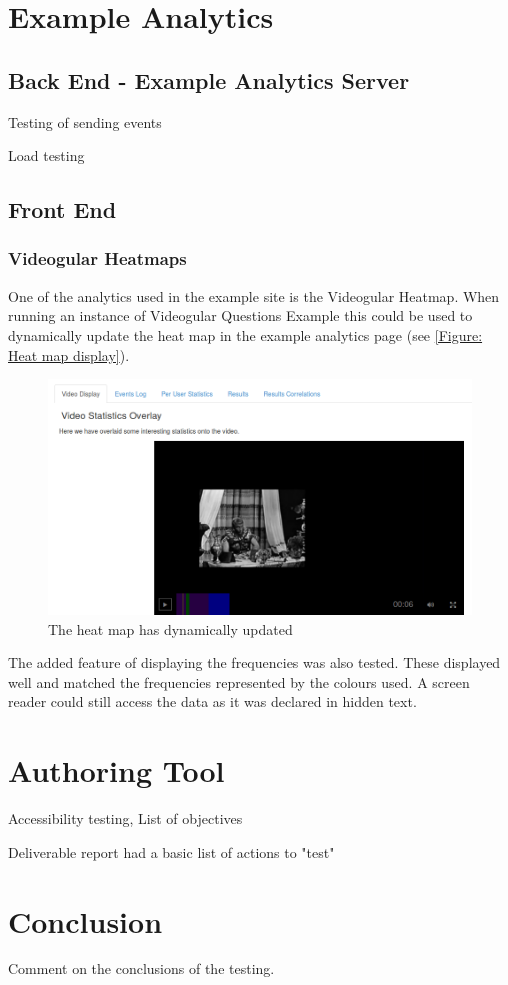 \section{Example Analytics}

\subsection{Back End - Example Analytics Server}
\label{Subsection:Analytics server in example}
Testing of sending events

Load testing

\subsection{Front End}
\subsubsection{Videogular Heatmaps}
\label{Subsubsection:Videogular Heatmaps in example}

One of the analytics used in the example site is the \gls{Videogular} Heatmap. When running an instance of \gls{Videogular} Questions Example this could be used to dynamically update the heat map in the example analytics page (see \autoref{Figure: Heat map display}).

\begin{figure}[h]
	\centering 
		\includegraphics[scale=0.4]{../figures/heatmapDisplay.png} 		
	\caption{\label{Figure: Heat map display} The heat map has dynamically updated} 	
\end{figure}

The added feature of displaying the frequencies was also tested. These displayed well and matched the frequencies represented by the colours used. A screen reader could still access the data as it was declared in hidden text.

\section{Authoring Tool}

Accessibility testing, List of objectives

Deliverable report had a basic list of actions to "test"


\section{Conclusion}

Comment on the conclusions of the testing.

